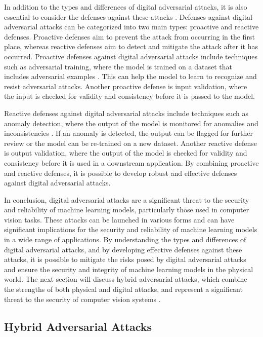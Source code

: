 \documentclass[11pt]{article}
\begin{document}
In addition to the types and differences of digital adversarial attacks, it is also essential to consider the defenses against these attacks \cite{ref51}. Defenses against digital adversarial attacks can be categorized into two main types: proactive and reactive defenses. Proactive defenses aim to prevent the attack from occurring in the first place, whereas reactive defenses aim to detect and mitigate the attack after it has occurred. Proactive defenses against digital adversarial attacks include techniques such as adversarial training, where the model is trained on a dataset that includes adversarial examples \cite{ref49}. This can help the model to learn to recognize and resist adversarial attacks. Another proactive defense is input validation, where the input is checked for validity and consistency before it is passed to the model.

Reactive defenses against digital adversarial attacks include techniques such as anomaly detection, where the output of the model is monitored for anomalies and inconsistencies \cite{ref52}. If an anomaly is detected, the output can be flagged for further review or the model can be re-trained on a new dataset. Another reactive defense is output validation, where the output of the model is checked for validity and consistency before it is used in a downstream application. By combining proactive and reactive defenses, it is possible to develop robust and effective defenses against digital adversarial attacks.

In conclusion, digital adversarial attacks are a significant threat to the security and reliability of machine learning models, particularly those used in computer vision tasks. These attacks can be launched in various forms and can have significant implications for the security and reliability of machine learning models in a wide range of applications. By understanding the types and differences of digital adversarial attacks, and by developing effective defenses against these attacks, it is possible to mitigate the risks posed by digital adversarial attacks and ensure the security and integrity of machine learning models in the physical world. The next section will discuss hybrid adversarial attacks, which combine the strengths of both physical and digital attacks, and represent a significant threat to the security of computer vision systems \cite{ref53}.

\subsection{Hybrid Adversarial Attacks}
\end{document}

